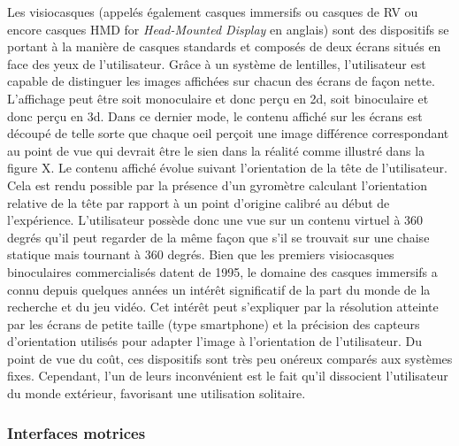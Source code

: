 Les visiocasques (appelés également casques immersifs ou casques de RV ou encore casques HMD for \textit{Head-Mounted Display} en anglais) sont des dispositifs se portant à la manière de casques standards et composés de deux écrans situés en face des yeux de l'utilisateur. Grâce à un système de lentilles, l'utilisateur est capable de distinguer les images affichées sur chacun des écrans de façon nette. L'affichage peut être soit monoculaire et donc perçu en 2d, soit binoculaire et donc perçu en 3d. Dans ce dernier mode, le contenu affiché sur les écrans est découpé de telle sorte que chaque oeil perçoit une image différence correspondant au point de vue qui devrait être le sien dans la réalité comme illustré dans la figure X. Le contenu affiché évolue suivant l'orientation de la tête de l'utilisateur. Cela est rendu possible par la présence d'un gyromètre calculant l'orientation relative de la tête par rapport à un point d'origine calibré au début de l'expérience. L'utilisateur possède donc une vue sur un contenu virtuel à 360 degrés qu'il peut regarder de la même façon que s'il se trouvait sur une chaise statique mais tournant à 360 degrés. Bien que les premiers visiocasques binoculaires commercialisés datent de 1995, le domaine des casques immersifs a connu depuis quelques années un intérêt significatif de la part du monde de la recherche et du jeu vidéo. Cet intérêt peut s'expliquer par la résolution atteinte par les écrans de petite taille (type smartphone) et la précision des capteurs d'orientation utilisés pour adapter l'image à l'orientation de l'utilisateur. Du point de vue du coût, ces dispositifs sont très peu onéreux comparés aux systèmes fixes. Cependant, l'un de leurs inconvénient est le fait qu'il dissocient l'utilisateur du monde extérieur, favorisant une utilisation solitaire.

\subsubsection{Interfaces motrices} \label{interface_motor}

